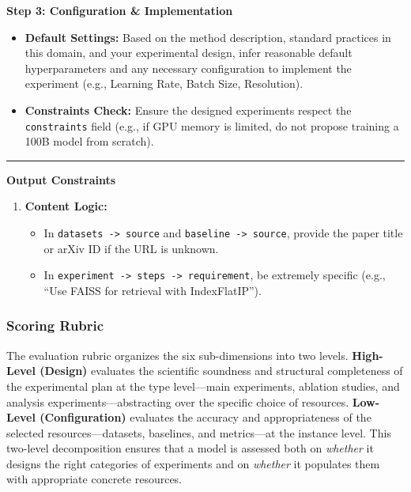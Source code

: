 \begin{tcolorbox}
\medskip
\textbf{Step 3: Configuration \& Implementation}
\begin{itemize}[nosep,leftmargin=12pt]
	\item \textbf{Default Settings:} Based on the method description, standard practices in this domain, and your experimental design, infer reasonable default hyperparameters and any necessary configuration to implement the experiment (e.g., Learning Rate, Batch Size, Resolution).
	\item \textbf{Constraints Check:} Ensure the designed experiments respect the \texttt{constraints} field (e.g., if GPU memory is limited, do not propose training a 100B model from scratch).
\end{itemize}

\medskip\hrule\medskip

\textbf{Output Constraints}
\begin{enumerate}[nosep,leftmargin=12pt]
	\item \textbf{Content Logic:}
	\begin{itemize}[nosep,leftmargin=16pt]
		\item In \texttt{datasets -> source} and \texttt{baseline -> source}, provide the paper title or arXiv ID if the URL is unknown.
		\item In \texttt{experiment -> steps -> requirement}, be extremely specific (e.g., ``Use FAISS for retrieval with IndexFlatIP'').
	\end{itemize}
\end{enumerate}
\end{tcolorbox}

\subsubsection{Scoring Rubric}

The evaluation rubric organizes the six sub-dimensions into two levels. \textbf{High-Level (Design)} evaluates the scientific soundness and structural completeness of the experimental plan at the type level---main experiments, ablation studies, and analysis experiments---abstracting over the specific choice of resources. \textbf{Low-Level (Configuration)} evaluates the accuracy and appropriateness of the selected resources---datasets, baselines, and metrics---at the instance level. This two-level decomposition ensures that a model is assessed both on \textit{whether} it designs the right categories of experiments and on \textit{whether} it populates them with appropriate concrete resources.

